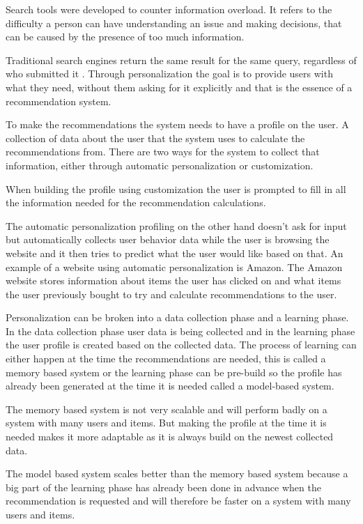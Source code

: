 Search tools were developed to counter information overload. It refers to the difficulty a person can have understanding an issue and making decisions, that can be caused by the presence of too much information.\cite{recWikipedia}

Traditional search engines return the same result for the same query, regardless of who submitted it \cite{TheAdaptiveWeb}. Through personalization the goal is to provide users with what they need, without them asking for it explicitly and that is the essence of a recommendation system.

To make the recommendations the system needs to have a profile on the user. A collection of data about the user that the system uses to calculate the recommendations from. There are two ways for the system to collect that information, either through automatic personalization or customization.

When building the profile using customization the user is prompted to fill in all the information needed for the recommendation calculations.

The automatic personalization profiling on the other hand doesn't ask for input but automatically collects user behavior data while the user is browsing the website and it then tries to predict what the user would like based on that. An example of a website using automatic personalization is Amazon. The Amazon website stores information about items the user has clicked on and what items the user previously bought to try and calculate recommendations to the user. 	
   
Personalization can be broken into a data collection phase and a learning phase. In the data collection phase user data is being collected and in the learning phase the user profile is created based on the collected data. The process of learning can either happen at the time the recommendations are needed, this is called a memory based system or the learning phase can be pre-build so the profile has already been generated at the time it is needed called a model-based system.	

The memory based system is not very scalable and will perform badly on a system with many users and items. But making the profile at the time it is needed makes it more adaptable as it is always build on the newest collected data.

The model based system scales better than the memory based system because a big part of the learning phase has already been done in advance when the recommendation is requested and will therefore be faster on a system with many users and items. 
